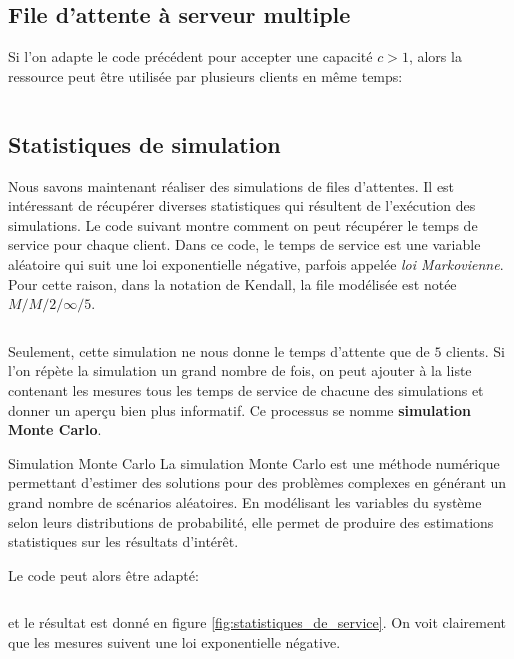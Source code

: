         \subsection{File d'attente à serveur multiple}
            Si l'on adapte le code précédent pour accepter une capacité $c>1$, alors la ressource peut être utilisée par plusieurs clients en même temps:
            \inputminted{python}{codes/serveur_multiple.py}

        \subsection{Statistiques de simulation}
            Nous savons maintenant réaliser des simulations de files d'attentes. Il est intéressant de récupérer diverses statistiques qui résultent de l'exécution des simulations. Le code suivant montre comment on peut récupérer le temps de service pour chaque client. Dans ce code, le temps de service est une variable aléatoire qui suit une loi exponentielle négative, parfois appelée \textit{loi Markovienne}. Pour cette raison, dans la notation de Kendall, la file modélisée est notée $M/M/2/\infty/5$.
            \inputminted{python}{codes/statistiques_de_service.py}
            Seulement, cette simulation ne nous donne le temps d'attente que de $5$ clients. Si l'on répète la simulation un grand nombre de fois, on peut ajouter à la liste contenant les mesures tous les temps de service de chacune des simulations et donner un aperçu bien plus informatif. Ce processus se nomme \textbf{simulation Monte Carlo}.
            \begin{definition}{Simulation Monte Carlo}
                La simulation Monte Carlo est une méthode numérique permettant d'estimer des solutions pour des problèmes complexes en générant un grand nombre de scénarios aléatoires. En modélisant les variables du système selon leurs distributions de probabilité, elle permet de produire des estimations statistiques sur les résultats d'intérêt.
            \end{definition}
            Le code peut alors être adapté: 
            \inputminted{python}{codes/statistiques_de_service_2.py} et le résultat est donné en figure \ref{fig:statistiques_de_service}. On voit clairement que les mesures suivent une loi exponentielle négative.
